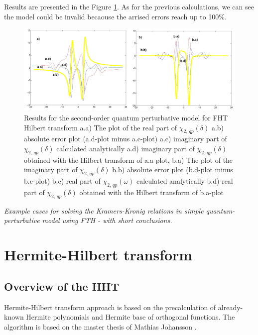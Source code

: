 \documentclass[12pt,twoside,a4paper]{article}
\numberwithin{equation}{subsection}
\numberwithin{figure}{subsection}
\begin{document}
Results are presented in the Figure \ref{fig:fht_qp2}. As for the previous calculations, we can see the model could be invalid
becaouse the arrised errors reach up to 100\%.

\begin{figure} 
  \includegraphics[width=150mm]{img/fht_qp2.png}
  \caption{Results for the second-order quantum perturbative model for FHT Hilbert transform
     a.a) The plot of the real part of ${\chi_{2, \,qp}}(\delta )$
     a.b) absolute error plot (a.d-plot minus a.c-plot) 
     a.c) imaginary part of ${\chi_{2, \,qp}}(\delta )$ calculated analytically 
     a.d) imaginary part of ${\chi_{2, \,qp}}(\delta )$ obtained with the Hilbert transform of a.a-plot, 
     b.a) The plot of the imaginary part of ${\chi_{2, \,qp}}(\delta )$ 
     b.b) absolute error plot (b.d-plot minus b.c-plot) 
     b.c) real part of $\chi_{2, \,qp} (\omega )$ calculated analytically 
     b.d) real part of ${\chi_{2, \,qp}}(\delta )$ obtained with the Hilbert transform of b.a-plot 
     \label{fig:fht_qp2}
     }
\end{figure}

\textit{Example cases for solving the Kramers-Kronig relations in simple quantum-perturbative model using FTH - with short
conclusions.}


\section{Hermite-Hilbert transform} \label{chap:hermite}

\subsection{Overview of the HHT}  \label{chap:hermite_overview}

Hermite-Hilbert transform approach is based on the precalculation of already-known Hermite polynomials and Hermite base of orthogonal
functions. The algorithm is based on the master thesis of Mathias Johansson \cite{johansson_hilbert}.
\end{document}
